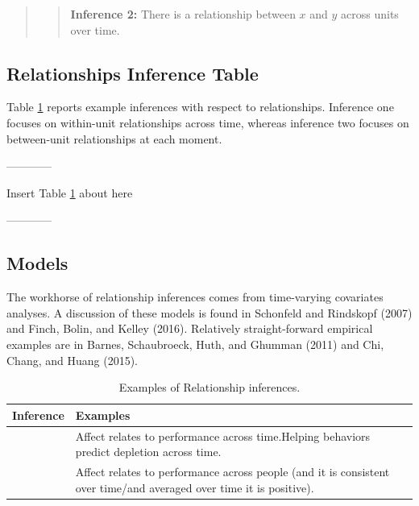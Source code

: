 \documentclass[english,,man]{apa6}
\theoremstyle{definition}
\theoremstyle{definition}
\theoremstyle{definition}
\theoremstyle{remark}
\begin{document}
\begin{quote}
\begin{quote}
\textbf{Inference 2:} There is a relationship between \(x\) and \(y\)
across units over time.
\end{quote}
\end{quote}

\hypertarget{relationships-inference-table}{%
\subsection{Relationships Inference
Table}\label{relationships-inference-table}}

Table \ref{relationships_table} reports example inferences with respect
to relationships. Inference one focuses on within-unit relationships
across time, whereas inference two focuses on between-unit relationships
at each moment.

\begin{center}

------------

Insert Table \ref{relationships_table} about here

------------

\end{center}

\hypertarget{models-2}{%
\subsection{Models}\label{models-2}}

The workhorse of relationship inferences comes from time-varying
covariates analyses. A discussion of these models is found in Schonfeld
and Rindskopf (2007) and Finch, Bolin, and Kelley (2016). Relatively
straight-forward empirical examples are in Barnes, Schaubroeck, Huth,
and Ghumman (2011) and Chi, Chang, and Huang (2015).

\begin{table}

\caption{\label{tab:unnamed-chunk-16}\label{relationships_table}Examples of Relationship inferences.}
\centering
\begin{tabular}[t]{>{\raggedright\arraybackslash}p{5em}>{\raggedright\arraybackslash}p{30em}}
\toprule
Inference & Examples\\
\midrule
1 & Affect relates to performance across time.\newline Helping behaviors predict depletion across time.\\
\hline
2 & Affect relates to performance across people (and it is consistent over time/and averaged over time it is positive).\\
\bottomrule
\end{tabular}
\end{table}
\end{document}
